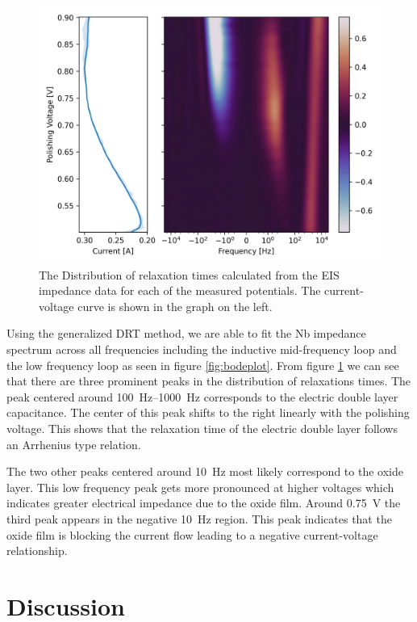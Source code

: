 \documentclass{revtex4-2}
\begin{document}
\begin{figure}[t]
  \label{fig:gamma}
  \includegraphics[width=\textwidth]{../figures/gamma.png}  
  \caption{The Distribution of relaxation times calculated from the EIS impedance data for each of the measured potentials. The current-voltage curve is shown in the graph on the left.}
\end{figure}

Using the generalized DRT method, we are able to fit the Nb impedance spectrum across all frequencies including the inductive mid-frequency loop and the low frequency loop as seen in figure \ref{fig:bodeplot}. From figure \ref{fig:gamma} we can see that there are three prominent peaks in the distribution of relaxations times. The peak centered around \qtyrange{100}{1000}{\hertz} corresponds to the electric double layer capacitance. The center of this peak shifts to the right linearly with the polishing voltage. This shows that the relaxation time of the electric double layer follows an Arrhenius type relation.

The two other peaks centered around \qty{10}{\hertz} most likely correspond to the oxide layer. This low frequency peak gets more pronounced at higher voltages which indicates greater electrical impedance due to the oxide film. Around \qty{0.75}{\volt} the third peak appears in the negative \qty{10}{\hertz} region. This peak indicates that the oxide film is blocking the current flow leading to a negative current-voltage relationship.



\section{Discussion}
\end{document}
